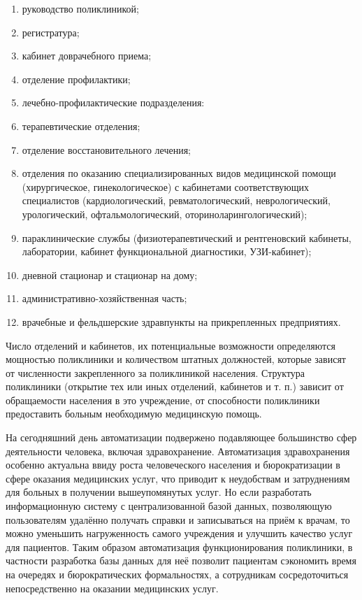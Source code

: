 \documentclass[14pt,a4paper,russian]{extreport}
\begin{document}
\begin{enumerate}[noitemsep]
    \item руководство поликлиникой;
    \item регистратура;
    \item кабинет доврачебного приема;
    \item отделение профилактики;
    \item лечебно-профилактические подразделения:
    \item терапевтические отделения;
    \item отделение восстановительного лечения;
    \item отделения по оказанию специализированных видов медицинской помощи (хирургическое,
        гинекологическое) с кабинетами соответствующих специалистов (кардиологический,
        ревматологический, неврологический, урологический, офтальмологический,
        оториноларингологический);
    \item параклинические службы (физиотерапевтический и рентгеновский кабинеты, лаборатории, кабинет
        функциональной диагностики, УЗИ-кабинет);
    \item дневной стационар и стационар на дому;
    \item административно-хозяйственная часть;
    \item врачебные и фельдшерские здравпункты на прикрепленных предприятиях.
\end{enumerate}

Число отделений и кабинетов, их потенциальные возможности определяются мощностью поликлиники и
количеством штатных должностей, которые зависят от численности закрепленного за
поликлиникой населения. Структура поликлиники (открытие тех или иных отделений, кабинетов и
т. п.) зависит от обращаемости населения в это учреждение, от способности поликлиники предоставить
больным необходимую медицинскую помощь.\cite{medstat}

На сегодняшний день автоматизации подвержено подавляющее большинство сфер деятельности человека,
включая здравохранение. Автоматизация здравохранения особенно актуальна ввиду роста человеческого населения
и бюрократизации в сфере оказания медицинских услуг, что приводит к неудобствам и
затруднениям для больных
в получении вышеупомянутых услуг. Но если разработать информационную систему с
централизованной базой данных, позволяющую пользователям удалённо получать справки и записываться
на приём к
врачам, то можно уменьшить нагруженность самого учреждения и улучшить качество услуг для
пациентов. Таким образом автоматизация функционирования
поликлиники, в частности разработка базы данных для неё позволит пациентам сэкономить время на
очередях и бюрократических формальностях, а сотрудникам сосредоточиться непосредственно на
оказании медицинских услуг.
\end{document}
